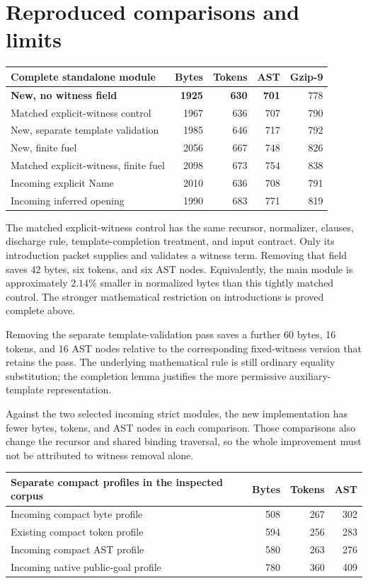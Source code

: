 \documentclass[11pt]{article}
\theoremstyle{definition}\newtheorem{definition}[theorem]{Definition}
\theoremstyle{remark}\newtheorem{remark}[theorem]{Remark}
\begin{document}
\section{Reproduced comparisons and limits}
\label{sec:comparisons}

\begin{center}
\begin{tabular}{lrrrr}
\toprule
Complete standalone module & Bytes & Tokens & AST & Gzip-9\\
\midrule
\textbf{New, no witness field} & \textbf{1925}&\textbf{630}&\textbf{701}&778\\
Matched explicit-witness control &1967&636&707&790\\
New, separate template validation &1985&646&717&792\\
New, finite fuel &2056&667&748&826\\
Matched explicit-witness, finite fuel &2098&673&754&838\\
\midrule
Incoming explicit Name &2010&636&708&791\\
Incoming inferred opening &1990&683&771&819\\
\bottomrule
\end{tabular}
\end{center}

The matched explicit-witness control has the same recursor, normalizer,
clauses, discharge rule, template-completion treatment, and input contract.
Only its introduction packet supplies and validates a witness term.
Removing that field saves 42 bytes, six tokens, and six AST nodes.
Equivalently, the main module is approximately $2.14\%$ smaller in
normalized bytes than this tightly matched control. The stronger
mathematical restriction on introductions is proved complete above.

Removing the separate template-validation pass saves a further 60 bytes,
16 tokens, and 16 AST nodes relative to the corresponding fixed-witness
version that retains the pass. The underlying mathematical rule is still
ordinary equality substitution; the completion lemma justifies the
more permissive auxiliary-template representation.

Against the two selected incoming strict modules, the new implementation
has fewer bytes, tokens, and AST nodes in each comparison. Those comparisons
also change the recursor and shared binding traversal, so the whole
improvement must not be attributed to witness removal alone.

\begin{center}
\begin{tabular}{lrrr}
\toprule
Separate compact profiles in the inspected corpus & Bytes & Tokens & AST\\
\midrule
Incoming compact byte profile &508&267&302\\
Existing compact token profile &594&256&283\\
Incoming compact AST profile &580&263&276\\
Incoming native public-goal profile &780&360&409\\
\bottomrule
\end{tabular}
\end{center}
\end{document}
